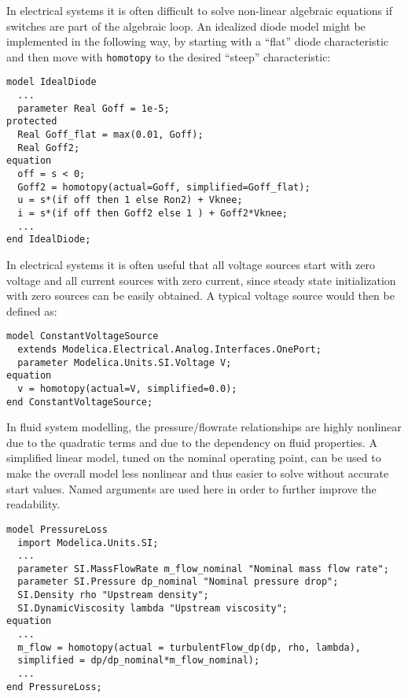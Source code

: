 \begin{example}[1] In electrical systems it is often difficult to solve non-linear
algebraic equations if switches are part of the algebraic loop. An
idealized diode model might be implemented in the following way, by
starting with a ``flat'' diode characteristic and then move with
\lstinline!homotopy! to the desired ``steep'' characteristic:
\begin{lstlisting}[language=modelica]
model IdealDiode
  ...
  parameter Real Goff = 1e-5;
protected
  Real Goff_flat = max(0.01, Goff);
  Real Goff2;
equation
  off = s < 0;
  Goff2 = homotopy(actual=Goff, simplified=Goff_flat);
  u = s*(if off then 1 else Ron2) + Vknee;
  i = s*(if off then Goff2 else 1 ) + Goff2*Vknee;
  ...
end IdealDiode;
\end{lstlisting}
\end{example}

\begin{example}[2] In electrical systems it is often useful that all voltage sources
start with zero voltage and all current sources with zero current, since
steady state initialization with zero sources can be easily obtained. A
typical voltage source would then be defined as:
\begin{lstlisting}[language=modelica]
model ConstantVoltageSource
  extends Modelica.Electrical.Analog.Interfaces.OnePort;
  parameter Modelica.Units.SI.Voltage V;
equation
  v = homotopy(actual=V, simplified=0.0);
end ConstantVoltageSource;
\end{lstlisting}
\end{example}

\begin{example}[3] In fluid system modelling, the pressure/flowrate relationships are
highly nonlinear due to the quadratic terms and due to the dependency on
fluid properties. A simplified linear model, tuned on the nominal
operating point, can be used to make the overall model less nonlinear
and thus easier to solve without accurate start values. Named arguments
are used here in order to further improve the readability.
\begin{lstlisting}[language=modelica]
model PressureLoss
  import Modelica.Units.SI;
  ...
  parameter SI.MassFlowRate m_flow_nominal "Nominal mass flow rate";
  parameter SI.Pressure dp_nominal "Nominal pressure drop";
  SI.Density rho "Upstream density";
  SI.DynamicViscosity lambda "Upstream viscosity";
equation
  ...
  m_flow = homotopy(actual = turbulentFlow_dp(dp, rho, lambda),
  simplified = dp/dp_nominal*m_flow_nominal);
  ...
end PressureLoss;
\end{lstlisting}
\end{example}

